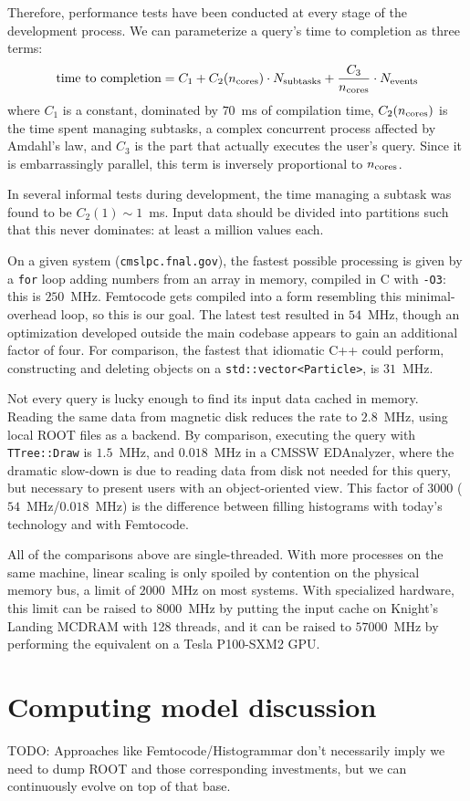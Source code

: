 \documentclass{article}
\begin{document}
Therefore, performance tests have been conducted at every stage of the development process. We can parameterize a query's time to completion as three terms:
\begin{equation}
\mbox{time to completion} = C_1 + C_2(n_{\mbox{\scriptsize cores}}) \cdot N_{\mbox{\scriptsize subtasks}} + \frac{C_3}{n_{\mbox{\scriptsize cores}}} \cdot N_{\mbox{\scriptsize events}}
\end{equation}
where $C_1$ is a constant, dominated by $70$~ms of compilation time, $C_2(n_{\mbox{\scriptsize cores}})$ is the time spent managing subtasks, a complex concurrent process affected by Amdahl's law, and $C_3$ is the part that actually executes the user's query. Since it is embarrassingly parallel, this term is inversely proportional to $n_{\mbox{\scriptsize cores}}$.

In several informal tests during development, the time managing a subtask was found to be $C_2(1) \sim 1$~ms. Input data should be divided into partitions such that this never dominates: at least a million values each.

On a given system ({\tt cmslpc.fnal.gov}), the fastest possible processing is given by a {\tt for} loop adding numbers from an array in memory, compiled in C with {\tt -O3}: this is $250$~MHz. Femtocode gets compiled into a form resembling this minimal-overhead loop, so this is our goal. The latest test resulted in $54$~MHz, though an optimization developed outside the main codebase appears to gain an additional factor of four. For comparison, the fastest that idiomatic C++ could perform, constructing and deleting objects on a {\tt std::vector<Particle>}, is $31$~MHz.

Not every query is lucky enough to find its input data cached in memory. Reading the same data from magnetic disk reduces the rate to $2.8$~MHz, using local ROOT files as a backend. By comparison, executing the query with {\tt TTree::Draw} is $1.5$~MHz, and $0.018$~MHz in a CMSSW EDAnalyzer, where the dramatic slow-down is due to reading data from disk not needed for this query, but necessary to present users with an object-oriented view. This factor of 3000 ($54$~MHz/$0.018$~MHz) is the difference between filling histograms with today's technology and with Femtocode.

All of the comparisons above are single-threaded. With more processes on the same machine, linear scaling is only spoiled by contention on the physical memory bus, a limit of $2000$~MHz on most systems. With specialized hardware\footnotemark, this limit can be raised to $8000$~MHz by putting the input cache on Knight's Landing MCDRAM with 128 threads, and it can be raised to $57000$~MHz by performing the equivalent on a Tesla P100-SXM2 GPU.


\section{Computing model discussion}

TODO: Approaches like Femtocode/Histogrammar don't necessarily imply we need to dump ROOT and those corresponding investments, but we can continuously evolve on top of that base.
\end{document}
